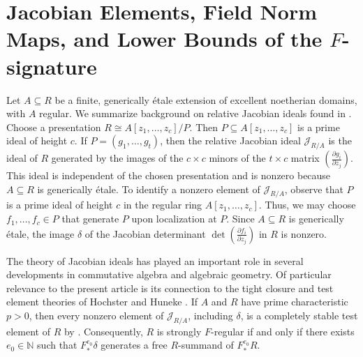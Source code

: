 \documentclass[12pt]{amsart}
\numberwithin{equation}{theorem}
\theoremstyle{plain}
\newcommand{\fm}{\mathfrak{m}}
\newcommand{\NN}{\mathbb{N}}
\begin{document}

\section{Jacobian Elements, Field Norm Maps, and Lower Bounds of the $F$-signature}
Let $A\subseteq R$ be a finite, generically \'etale extension of excellent noetherian domains, with $A$ regular. We summarize background on relative Jacobian ideals found in \cite{LipmanSathaye1981,Hochster2002}. Choose a presentation $R\cong A[z_1,\ldots,z_c]/P$. Then $P\subseteq A[z_1,\ldots,z_c]$ is a prime ideal of height $c$. If $P=(g_1,\ldots,g_t)$, then the relative Jacobian ideal $\mathcal{J}_{R/A}$ is the ideal of $R$ generated by the images of the $c\times c$ minors of the $t\times c$ matrix $(\frac{\partial g_i}{\partial z_j})$. This ideal is independent of the chosen presentation and is nonzero because $A\subseteq R$ is generically \'etale. To identify a nonzero element of $\mathcal{J}_{R/A}$, observe that $P$ is a prime ideal of height $c$ in the regular ring $A[z_1,\ldots,z_c]$. Thus, we may choose $f_1,\ldots,f_c\in P$ that generate $P$ upon localization at $P$. Since $A\subseteq R$ is generically \'etale, the image $\delta$ of the Jacobian determinant $\det\left(\frac{\partial f_i}{\partial z_j}\right)$ in $R$ is nonzero.

The theory of Jacobian ideals has played an important role in several developments in commutative algebra and algebraic geometry. Of particular relevance to the present article is its connection to the tight closure and test element theories of Hochster and Huneke \cite{HochsterHunekeTC}. If $A$ and $R$ have prime characteristic $p>0$, then every nonzero element of $\mathcal{J}_{R/A}$, including $\delta$, is a completely stable test element of $R$ by \cite[Corollary~(1.5.4)]{HochsterHunekeTC}. Consequently, $R$ is strongly $F$-regular if and only if there exists $e_0\in\NN$ such that $F^{e_0}_*\delta$ generates a free $R$-summand of $F^{e_0}_*R$.
\end{document}
